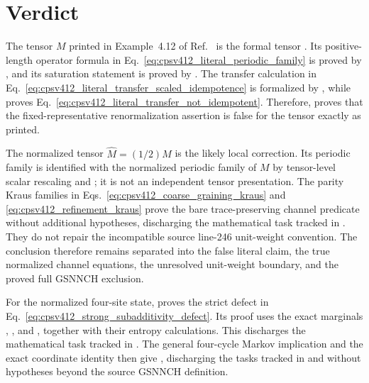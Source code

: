 \documentclass{article}
\begin{document}
\section{Verdict}

The tensor $M$ printed in Example~4.12 of
Ref.~\cite{Cirac2016MPDO_arXiv} is the formal tensor
. Its positive-length operator
formula in Eq.~\ref{eq:cpsv412_literal_periodic_family} is proved by
, and its
saturation statement is proved by
. The transfer calculation in
Eq.~\ref{eq:cpsv412_literal_transfer_scaled_idempotence} is formalized by
, while
proves Eq.~\ref{eq:cpsv412_literal_transfer_not_idempotent}. Therefore,
 proves that the
fixed-representative renormalization assertion is false for the tensor exactly
as printed.

The normalized tensor $\widehat M=(1/2)M$ is the likely local correction. Its
periodic family is identified with the normalized periodic family of $M$ by
tensor-level scalar rescaling and ; it is not an
independent tensor presentation. The parity Kraus families in
Eqs.~\ref{eq:cpsv412_coarse_graining_kraus} and
\ref{eq:cpsv412_refinement_kraus} prove the bare trace-preserving channel
predicate without additional hypotheses, discharging the mathematical task
tracked in . They do not repair the incompatible source
line-246 unit-weight convention. The conclusion therefore remains separated
into the false literal claim, the true normalized channel equations, the
unresolved unit-weight boundary, and the proved full GSNNCH exclusion.

For the normalized four-site state,
proves the strict defect in
Eq.~\ref{eq:cpsv412_strong_subadditivity_defect}. Its proof uses the exact
marginals
,
, and
,
together with their entropy calculations. This discharges the mathematical
task tracked in . The general four-cycle Markov implication and
the exact coordinate identity then give
, discharging the tasks
tracked in  and  without hypotheses beyond the
source GSNNCH definition.



\end{document}
